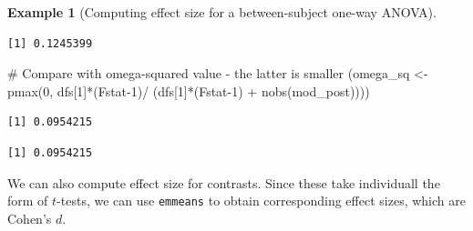 \documentclass[
  11pt,
  letterpaper,
]{scrbook}
\newenvironment{Shaded}{\begin{snugshade}}{\end{snugshade}}
\newcommand{\CommentTok}[1]{\textcolor[rgb]{0.37,0.37,0.37}{#1}}
\newcommand{\DecValTok}[1]{\textcolor[rgb]{0.68,0.00,0.00}{#1}}
\newcommand{\FunctionTok}[1]{\textcolor[rgb]{0.28,0.35,0.67}{#1}}
\newcommand{\NormalTok}[1]{\textcolor[rgb]{0.00,0.23,0.31}{#1}}
\newcommand{\OtherTok}[1]{\textcolor[rgb]{0.00,0.23,0.31}{#1}}
\newcommand{\SpecialCharTok}[1]{\textcolor[rgb]{0.37,0.37,0.37}{#1}}
\theoremstyle{definition}
\newtheorem{example}{Example}[chapter]
\theoremstyle{remark}
\begin{document}
\begin{example}[Computing effect size for a between-subject one-way
ANOVA]
\begin{Shaded}
\end{Shaded}

\begin{verbatim}
[1] 0.1245399
\end{verbatim}

\begin{Shaded}
\begin{Highlighting}[]
\CommentTok{\# Compare with omega{-}squared value {-} the latter is smaller}
\NormalTok{(omega\_sq }\OtherTok{\textless{}{-}} \FunctionTok{pmax}\NormalTok{(}\DecValTok{0}\NormalTok{, dfs[}\DecValTok{1}\NormalTok{]}\SpecialCharTok{*}\NormalTok{(Fstat}\DecValTok{{-}1}\NormalTok{)}\SpecialCharTok{/}\NormalTok{ (dfs[}\DecValTok{1}\NormalTok{]}\SpecialCharTok{*}\NormalTok{(Fstat}\DecValTok{{-}1}\NormalTok{) }\SpecialCharTok{+} \FunctionTok{nobs}\NormalTok{(mod\_post))))}
\end{Highlighting}
\end{Shaded}

\begin{verbatim}
[1] 0.0954215
\end{verbatim}

\begin{Shaded}
\end{Shaded}

\begin{verbatim}
[1] 0.0954215
\end{verbatim}

We can also compute effect size for contrasts. Since these take
individuall the form of \(t\)-tests, we can use \texttt{emmeans} to
obtain corresponding effect sizes, which are Cohen's \(d\).


\end{example}
\end{document}
